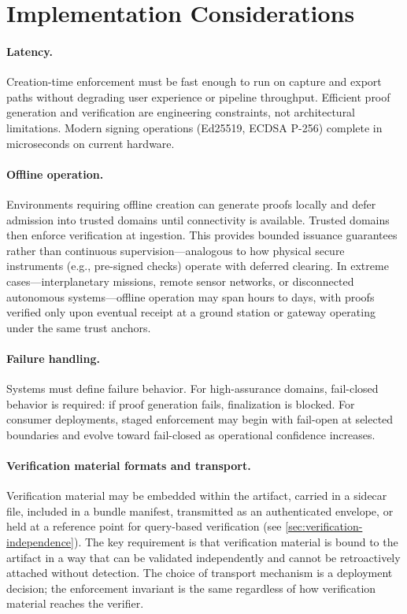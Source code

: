 \documentclass[11pt,letterpaper]{article}
\theoremstyle{occplain}
\theoremstyle{occremark}
\begin{document}
\section{Implementation Considerations}
\label{sec:implementation}

\paragraph{Latency.}
Creation-time enforcement must be fast enough to run on capture and export paths without degrading user experience or pipeline throughput. Efficient proof generation and verification are engineering constraints, not architectural limitations. Modern signing operations (Ed25519, ECDSA P-256) complete in microseconds on current hardware.

\paragraph{Offline operation.}
Environments requiring offline creation can generate proofs locally and defer admission into trusted domains until connectivity is available. Trusted domains then enforce verification at ingestion. This provides bounded issuance guarantees rather than continuous supervision---analogous to how physical secure instruments (e.g., pre-signed checks) operate with deferred clearing. In extreme cases---interplanetary missions, remote sensor networks, or disconnected autonomous systems---offline operation may span hours to days, with proofs verified only upon eventual receipt at a ground station or gateway operating under the same trust anchors.

\paragraph{Failure handling.}
Systems must define failure behavior. For high-assurance domains, fail-closed behavior is required: if proof generation fails, finalization is blocked. For consumer deployments, staged enforcement may begin with fail-open at selected boundaries and evolve toward fail-closed as operational confidence increases.

\paragraph{Verification material formats and transport.}
Verification material may be embedded within the artifact, carried in a sidecar file, included in a bundle manifest, transmitted as an authenticated envelope, or held at a reference point for query-based verification (see \cref{sec:verification-independence}). The key requirement is that verification material is bound to the artifact in a way that can be validated independently and cannot be retroactively attached without detection. The choice of transport mechanism is a deployment decision; the enforcement invariant is the same regardless of how verification material reaches the verifier.
\end{document}
